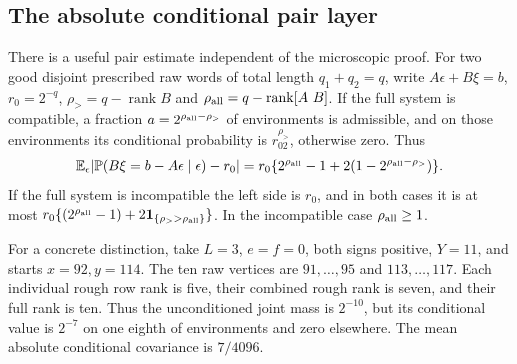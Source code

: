 \subsection{The absolute conditional pair layer}\label{supp:palm:subsec:pairs}
There is a useful pair estimate independent of the microscopic proof. For two good disjoint prescribed raw words of total length $q_1+q_2=q$, write
$A\epsilon+B\xi=b$, $r_0=2^{-q}$,
$\rho_>=q-\operatorname{rank}B$ and
$\rho_{\rm all}=q-\operatorname{rank}[A\ B]$.
If the full system is compatible, a fraction
$a=2^{\rho_{\rm all}-\rho_>}$ of environments is admissible, and on those environments its conditional probability is $r_02^{\rho_>}$, otherwise zero. Thus
\begin{equation}\label{supp:palm:eq:two-ranks}
 \mathbb E_\epsilon|\mathbb P(B\xi=b-A\epsilon\mid\epsilon)-r_0|
 =r_0\{2^{\rho_{\rm all}}-1+2(1-2^{\rho_{\rm all}-\rho_>})\}.
\end{equation}
If the full system is incompatible the left side is $r_0$, and in both cases it is at most
$r_0\{(2^{\rho_{\rm all}}-1)+2\mathbf 1_{\{\rho_> >\rho_{\rm all}\}}\}$.
In the incompatible case $\rho_{\rm all}\ge1$.

For a concrete distinction, take $L=3$, $e=f=0$, both signs positive, $Y=11$, and starts $x=92,y=114$. The ten raw vertices are $91,\ldots,95$ and $113,\ldots,117$. Each individual rough row rank is five, their combined rough rank is seven, and their full rank is ten. Thus the unconditioned joint mass is $2^{-10}$, but its conditional value is $2^{-7}$ on one eighth of environments and zero elsewhere. The mean absolute conditional covariance is $7/4096$.

